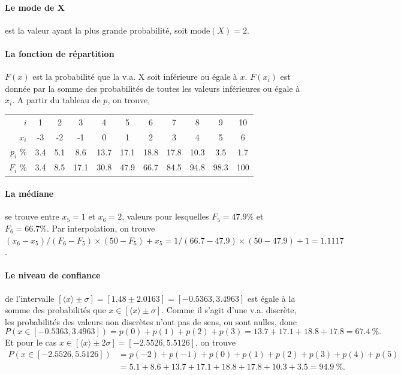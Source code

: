 \paragraph{Le mode de X} est la valeur ayant la plus grande probabilité, soit $\text{mode}(X)=2$.

\paragraph{La fonction de répartition} $F(x)$ est la probabilité que la v.a. X soit inférieure ou égale à $x$. $F(x_i)$ est donnée par la somme des probabilités de toutes les valeurs inférieures ou égale à $x_i$. A partir du tableau de $p$, on trouve,
\begin{center}
\begin{tabular}{r|cccccccccc}
$i$ & 1 & 2 & 3 & 4 & 5 & 6 & 7 & 8 & 9 & 10 \\
$x_i$    &  -3 &   -2 &   -1 &    0 & 1    & 2    & 3    & 4    & 5   & 6\\
$p_i$ \% & 3.4 & 5.1 & 8.6 & 13.7 & 17.1 & 18.8 & 17.8 & 10.3 & 3.5 & 1.7 \\
$F_i$ \% & 3.4 & 8.5 & 17.1 & 30.8 & 47.9 & 66.7 & 84.5 & 94.8 & 98.3 & 100
\end{tabular}
\end{center}

\paragraph{La médiane} se trouve entre $x_5=1$ et $x_6=2$, valeurs pour lesquelles $F_5=47.9\%$ et $F_6=66.7\%$. Par interpolation, on trouve $(x_6-x_5)/(F_6-F_5)\times(50-F_5)+x_5=1/(66.7-47.9)\times(50-47.9)+1=1.1117$.

\paragraph{Le niveau de confiance} de l'intervalle $[\langle x\rangle\pm\sigma]=[1.48\pm2.0163]=[-0.5363,3.4963]$ est égale à la somme des probabilités que $x\in[\langle x\rangle\pm\sigma]$. Comme il s'agit d'une v.a. discrète, les probabilités des valeurs non discrètes n'ont pas de sens, ou sont nulles, donc
$$
P(x\in[-0.5363,3.4963])=p(0)+p(1)+p(2)+p(3)=13.7+17.1+18.8+17.8=67.4\ \%.
$$
Et pour le cas $x\in[\langle x\rangle\pm2\sigma]=[-2.5526,5.5126]$, on trouve
\begin{align*}
P(x\in[-2.5526,5.5126])&=p(-2)+p(-1)+p(0)+p(1)+p(2)+p(3)+p(4)+p(5)\\
&=5.1+8.6+13.7+17.1+18.8+17.8+10.3+3.5=94.9\ \%.
\end{align*}

